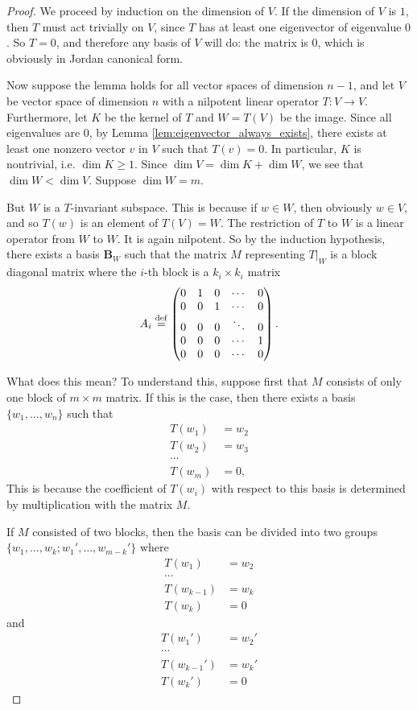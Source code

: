 \begin{proof}
We proceed by induction on the dimension of $V$. If the dimension 
of $V$ is $1$, then $T$ must act trivially on $V$, since $T$ has 
at least one eigenvector of eigenvalue $0$. So $T = 0$, and 
therefore any basis of $V$ will do: the matrix is $0$, which is 
obviously in Jordan canonical form.

Now suppose the lemma holds for all vector spaces of dimension
$n - 1$, and let $V$ be vector space of dimension $n$ with a 
nilpotent linear operator $T: V \to V$. Furthermore, let $K$ be
the kernel of $T$ and $W = T(V)$ be the image. Since all eigenvalues
are $0$, by Lemma \ref{lem:eigenvector_always_exists}, there 
exists at least one nonzero vector $v$ in $V$ such that $T(v) = 0$.
In particular, $K$ is nontrivial, i.e. $\dim K \geq 1$. Since 
$\dim V = \dim K + \dim W$, we see that $\dim W < \dim V$. Suppose
$\dim W = m$.

But $W$ is a $T$-invariant subspace. This is because if $w \in W$, 
then obviously $w \in V$, and so $T(w)$ is an element of $T(V) = 
W$. The restriction of $T$ to $W$ is a linear operator from $W$
to $W$. It is again nilpotent. So by the induction hypothesis, 
there exists a basis $\mathbf{B}_W$ such that the matrix $M$
representing $T|_W$ is a block diagonal matrix where the
$i$-th block is a $k_i \times k_i$ matrix
\[
A_i \stackrel{\mathrm{def}}{=}
\left(
\begin{matrix}
0 & 1 & 0 & \cdots & 0\\
0 & 0 & 1 & \cdots & 0\\
0 & 0 & 0 & \ddots & 0\\
0 & 0 & 0 & \cdots & 1\\
0 & 0 & 0 & \cdots & 0
\end{matrix}
\right).
\]

What does this mean? To understand this, suppose first that 
$M$ consists of only one block of $m \times m$ matrix. If this is 
the case, then there exists a basis $\{w_1,\dots,w_n\}$ such that 
\begin{align*}
T(w_1) &= w_2\\
T(w_2) &= w_3\\
\cdots\\ 
T(w_m) &= 0,
\end{align*}
This is because the coefficient of $T(w_i)$ with respect to this
basis is determined by multiplication with the matrix $M$.

If $M$ consisted of two blocks, then the basis can be divided into
two groups $\{w_1,\dots,w_k; w_1',\dots,w_{m - k}'\}$ where
\begin{align*}
T(w_1) &= w_2\\
\cdots\\
T(w_{k - 1}) &= w_k\\
T(w_k) &= 0
\end{align*}
and 
\begin{align*}
T(w_1') &= w_2'\\
\cdots\\
T(w_{k - 1}') &= w_k'\\
T(w_k') &= 0
\end{align*}


\end{proof}
